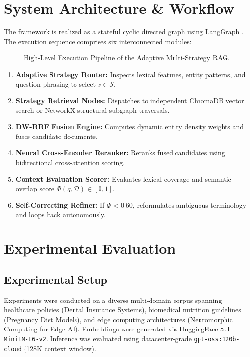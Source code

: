 \documentclass[conference]{IEEEtran}
\begin{document}
\section{System Architecture \& Workflow}
The framework is realized as a stateful cyclic directed graph using LangGraph \cite{langchain2023langgraph}. The execution sequence comprises six interconnected modules:

\begin{figure}[htbp]
\centering
{}
\caption{High-Level Execution Pipeline of the Adaptive Multi-Strategy RAG.}
\label{fig:pipeline}
\end{figure}

\begin{enumerate}
    \item \textbf{Adaptive Strategy Router:} Inspects lexical features, entity patterns, and question phrasing to select $s \in \mathcal{S}$.
    \item \textbf{Strategy Retrieval Nodes:} Dispatches to independent ChromaDB vector search or NetworkX structural subgraph traversals.
    \item \textbf{DW-RRF Fusion Engine:} Computes dynamic entity density weights and fuses candidate documents.
    \item \textbf{Neural Cross-Encoder Reranker:} Reranks fused candidates using bidirectional cross-attention scoring.
    \item \textbf{Context Evaluation Scorer:} Evaluates lexical coverage and semantic overlap score $\Phi(q, \mathcal{D}) \in [0, 1]$.
    \item \textbf{Self-Correcting Refiner:} If $\Phi < 0.60$, reformulates ambiguous terminology and loops back autonomously.
\end{enumerate}

\section{Experimental Evaluation}

\subsection{Experimental Setup}
Experiments were conducted on a diverse multi-domain corpus spanning healthcare policies (Dental Insurance Systems), biomedical nutrition guidelines (Pregnancy Diet Models), and edge computing architectures (Neuromorphic Computing for Edge AI). Embeddings were generated via HuggingFace \texttt{all-MiniLM-L6-v2}. Inference was evaluated using datacenter-grade \texttt{gpt-oss:120b-cloud} (128K context window).
\end{document}
